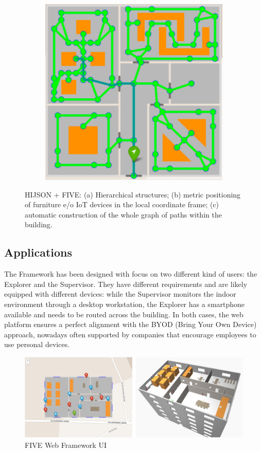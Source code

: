 \documentclass[]{egpubl}
\begin{document}
\begin{figure}[!h]
\begin{subfigure}[b]{0.255\linewidth}
  \includegraphics[width=\textwidth]{images/five3} 
  \caption{}
  \end{subfigure}
 
  \caption{HIJSON + FIVE: (a) Hierarchical structures; (b) metric positioning of furniture e/o IoT devices in the local coordinate frame; (c) automatic construction of the whole graph of paths within the building.}
   \label{fig:five-example}
 \end{figure}

\subsection{Applications}

The Framework has been designed with focus on two different kind of users: the
Explorer and the Supervisor. They have different requirements and are likely
equipped with different devices: while the Supervisor monitors the indoor
environment through a desktop workstation, the Explorer has a smartphone
available and needs to be routed across the building. In both cases, the web
platform ensures a perfect alignment with the BYOD (Bring Your Own Device)
approach, nowadays often supported by companies that encourage employees to
use personal devices.


\begin{figure}[htb]
\centering
\includegraphics[width=\linewidth]{images/2D-3D}
\caption{FIVE Web Framework UI}
\label{fig:web-framework-ui}
\end{figure}
\end{document}

